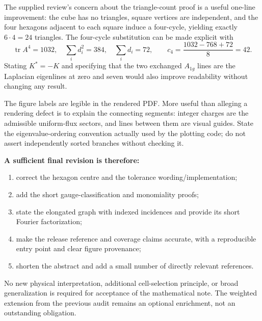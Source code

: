 \documentclass[11pt,a4paper]{article}
\newcommand{\tr}{\operatorname{tr}}\newcommand{\diag}{\operatorname{diag}}
\begin{document}
The supplied review's concern about the triangle-count proof is a useful one-line improvement: the cube has no triangles, square vertices are independent, and the four hexagons adjacent to each square induce a four-cycle, yielding exactly $6\cdot4=24$ triangles. The four-cycle substitution can be made explicit with
\[
 \tr A^4=1032,\quad \sum_i d_i^2=384,\quad \sum_i d_i=72,
 \qquad c_4=\frac{1032-768+72}{8}=42.
\]
Stating $K^*=-K$ and specifying that the two exchanged $A_{1g}$ lines are the Laplacian eigenlines at zero and seven would also improve readability without changing any result.

The figure labels are legible in the rendered PDF. More useful than alleging a rendering defect is to explain the connecting segments: integer charges are the admissible uniform-flux sectors, and lines between them are visual guides. State the eigenvalue-ordering convention actually used by the plotting code; do not assert independently sorted branches without checking it.

\textbf{A sufficient final revision is therefore:}
\begin{enumerate}
\item correct the hexagon centre and the tolerance wording/implementation;
\item add the short gauge-classification and monomiality proofs;
\item state the elongated graph with indexed incidences and provide its short Fourier factorization;
\item make the release reference and coverage claims accurate, with a reproducible entry point and clear figure provenance;
\item shorten the abstract and add a small number of directly relevant references.
\end{enumerate}
No new physical interpretation, additional cell-selection principle, or broad generalization is required for acceptance of the mathematical note. The weighted extension from the previous audit remains an optional enrichment, not an outstanding obligation.

\appendix
\small
\end{document}

